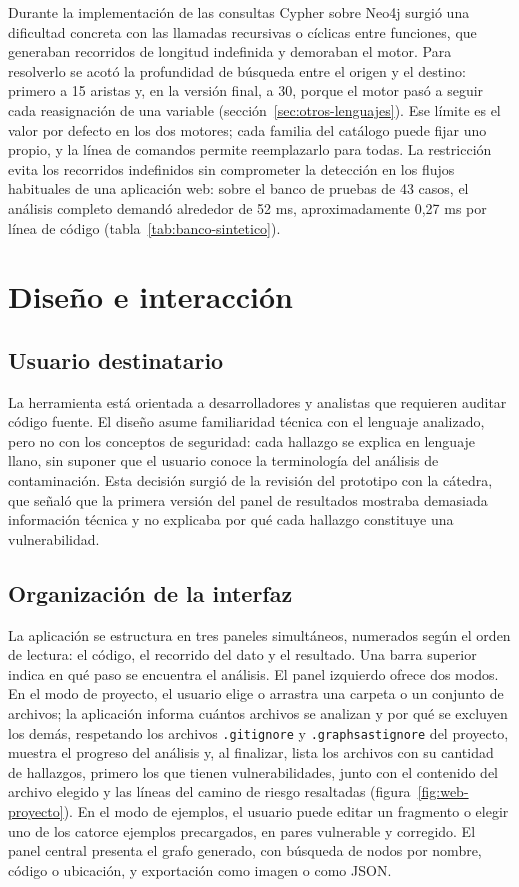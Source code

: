 Durante la implementación de las consultas Cypher sobre Neo4j surgió una dificultad concreta con las llamadas recursivas o cíclicas entre funciones, que generaban recorridos de longitud indefinida y demoraban el motor. Para resolverlo se acotó la profundidad de búsqueda entre el origen y el destino: primero a 15 aristas y, en la versión final, a 30, porque el motor pasó a seguir cada reasignación de una variable (sección~\ref{sec:otros-lenguajes}). Ese límite es el valor por defecto en los dos motores; cada familia del catálogo puede fijar uno propio, y la línea de comandos permite reemplazarlo para todas. La restricción evita los recorridos indefinidos sin comprometer la detección en los flujos habituales de una aplicación web: sobre el banco de pruebas de 43 casos, el análisis completo demandó alrededor de 52 ms, aproximadamente 0,27 ms por línea de código (tabla~\ref{tab:banco-sintetico}).

\section{Diseño e interacción}\label{sec:n4.6}

\subsection{Usuario destinatario}\label{sec:n4.6.1}

La herramienta está orientada a desarrolladores y analistas que requieren auditar código fuente. El diseño asume familiaridad técnica con el lenguaje analizado, pero no con los conceptos de seguridad: cada hallazgo se explica en lenguaje llano, sin suponer que el usuario conoce la terminología del análisis de contaminación. Esta decisión surgió de la revisión del prototipo con la cátedra, que señaló que la primera versión del panel de resultados mostraba demasiada información técnica y no explicaba por qué cada hallazgo constituye una vulnerabilidad.

\subsection{Organización de la interfaz}\label{sec:n4.6.2}

La aplicación se estructura en tres paneles simultáneos, numerados según el orden de lectura: el código, el recorrido del dato y el resultado. Una barra superior indica en qué paso se encuentra el análisis. El panel izquierdo ofrece dos modos. En el modo de proyecto, el usuario elige o arrastra una carpeta o un conjunto de archivos; la aplicación informa cuántos archivos se analizan y por qué se excluyen los demás, respetando los archivos \texttt{.gitignore} y \texttt{.graphsastignore} del proyecto, muestra el progreso del análisis y, al finalizar, lista los archivos con su cantidad de hallazgos, primero los que tienen vulnerabilidades, junto con el contenido del archivo elegido y las líneas del camino de riesgo resaltadas (figura~\ref{fig:web-proyecto}). En el modo de ejemplos, el usuario puede editar un fragmento o elegir uno de los catorce ejemplos precargados, en pares vulnerable y corregido. El panel central presenta el grafo generado, con búsqueda de nodos por nombre, código o ubicación, y exportación como imagen o como JSON.

